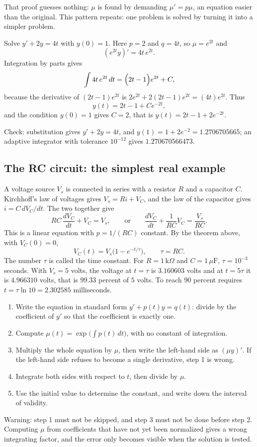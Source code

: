 That proof guesses nothing: $\mu$ is found by demanding $\mu'=p\mu$, an equation easier than
the original. This pattern repeats: one problem is solved by turning it into a simpler
problem.

\begin{contoh}
Solve $y'+2y=4t$ with $y(0)=1$. Here $p=2$ and $q=4t$, so $\mu=e^{2t}$ and
\[
(e^{2t}y)'=4t\,e^{2t}.
\]
Integration by parts gives
\[
\int 4t\,e^{2t}\,dt=\Bigl(2t-1\Bigr)e^{2t}+C ,
\]
because the derivative of $(2t-1)e^{2t}$ is $2e^{2t}+2(2t-1)e^{2t}=(4t)e^{2t}$. Thus
\[
y(t)=2t-1+Ce^{-2t},
\]
and the condition $y(0)=1$ gives $C=2$, that is $y(t)=2t-1+2e^{-2t}$.

Check: substitution gives $y'+2y=4t$, and $y(1)=1+2e^{-2}=1.2706705665$; an adaptive
integrator with tolerance $10^{-12}$ gives $1.270670566473$.
\end{contoh}

\subsection{The RC circuit: the simplest real example}

A voltage source $V_{s}$ is connected in series with a resistor $R$ and a capacitor $C$.
Kirchhoff's law of voltages gives $V_{s}=Ri+V_{C}$, and the law of the capacitor gives
$i=C\,dV_{C}/dt$. The two together give
\[
RC\,\frac{dV_{C}}{dt}+V_{C}=V_{s},
\qquad\text{or}\qquad
\frac{dV_{C}}{dt}+\frac{1}{RC}V_{C}=\frac{V_{s}}{RC}.
\]
This is a linear equation with $p=1/(RC)$ constant. By the theorem above, with
$V_{C}(0)=0$,
\[
V_{C}(t)=V_{s}\bigl(1-e^{-t/\tau}\bigr),\qquad \tau=RC .
\]
The number $\tau$ is called the time constant. For $R=1\,\mathrm{k}\Omega$ and
$C=1\,\mu\mathrm{F}$, $\tau=10^{-3}$ seconds. With $V_{s}=5$ volts, the voltage at
$t=\tau$ is $3.160603$ volts and at $t=5\tau$ it is $4.966310$ volts, that is $99.33$
percent of $5$ volts. To reach $90$ percent requires $t=\tau\ln10=2.302585$ milliseconds.

\begin{resep}
\begin{enumerate}
\item Write the equation in standard form $y'+p(t)y=q(t)$: divide by the coefficient of
  $y'$ so that the coefficient is exactly one.
\item Compute $\mu(t)=\exp\bigl(\int p(t)\,dt\bigr)$, with no constant of integration.
\item Multiply the whole equation by $\mu$, then write the left-hand side as $(\mu y)'$. If
  the left-hand side refuses to become a single derivative, step 1 is wrong.
\item Integrate both sides with respect to $t$, then divide by $\mu$.
\item Use the initial value to determine the constant, and write down the interval of
  validity.
\end{enumerate}
Warning: step 1 must not be skipped, and step 3 must not be done before step 2. Computing
$\mu$ from coefficients that have not yet been normalized gives a wrong integrating factor,
and the error only becomes visible when the solution is tested.
\end{resep}

